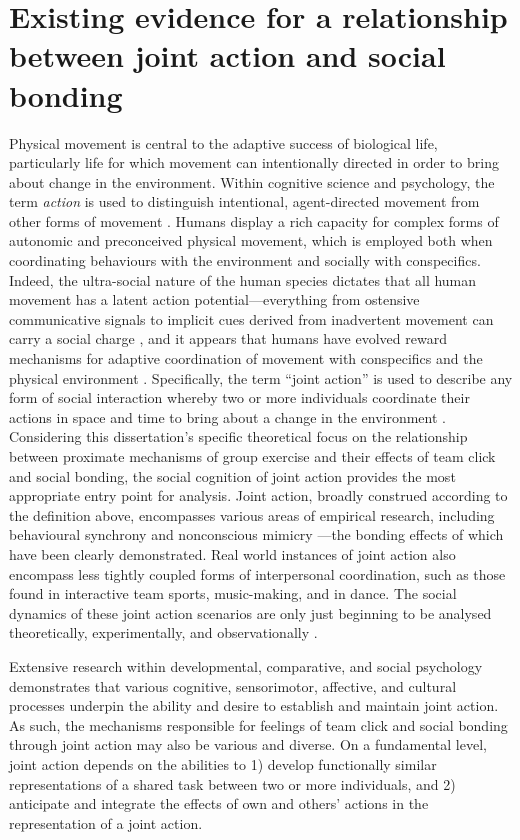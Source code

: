 \section{Existing evidence for a relationship between joint action and social bonding} %
Physical movement is central to the adaptive success of biological life, particularly life for which movement can intentionally directed in order to bring about change in the environment.  Within cognitive science and psychology, the term \textit{action} is used to distinguish intentional, agent-directed movement from other forms of movement \citep{Davidson1980}.  Humans display a rich capacity for complex forms of autonomic and preconceived physical movement, which is employed both when coordinating behaviours with the environment and socially with conspecifics.
Indeed, the ultra-social nature of the human species dictates that all human movement has a latent action potential---everything from ostensive communicative signals to implicit cues derived from inadvertent movement can carry a social charge \citep{Danchin2004}, and it appears that humans have evolved reward mechanisms for adaptive coordination of movement with conspecifics and the physical environment \citep{Wheatley2012,Parkinson2015,Wheatley2016}.
Specifically, the term ``joint action'' is used to describe any form of social interaction whereby two or more individuals coordinate their actions in space and time to bring about a change in the environment \citep{Sebanz2006a}. Considering this dissertation's specific theoretical focus on the relationship between proximate mechanisms of group exercise and their effects of team click and social bonding, the social cognition of joint action provides the most appropriate entry point for analysis.  Joint action, broadly construed according to the definition above, encompasses various areas of empirical research, including behavioural synchrony \citep{Reddish2013,Launay2016,Mogan2017} and nonconscious mimicry \citep{Bargh2012}---the bonding effects of which have been clearly demonstrated.  Real world instances of joint action also encompass less tightly coupled forms of interpersonal coordination, such as those found in interactive team sports, music-making, and in dance.  The social dynamics of these joint action scenarios are only just beginning to be analysed theoretically, experimentally, and observationally \citep{Marsh2009}.

Extensive research within developmental, comparative, and social psychology demonstrates that various cognitive, sensorimotor, affective, and cultural processes underpin the ability and desire to establish and maintain joint action.  As such, the mechanisms responsible for feelings of team click and social bonding through joint action may also be various and diverse.  On a fundamental level, joint action depends on the abilities to 1) develop functionally similar representations of a shared task between two or more individuals, and 2) anticipate and integrate the effects of own and others' actions in the representation of a joint action\citep{Sebanz2006a}.

